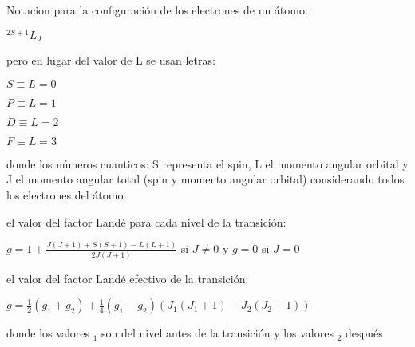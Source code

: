 \documentclass[10pt]{book}
\begin{document}
Notacion para la configuración de los electrones de un átomo:
\begin{description}
\item $^{2S+1}L_{J}$
\item pero en lugar del valor de L se usan letras:
\item $S \equiv L =0 $
\item $P \equiv L =1 $
\item $D \equiv L =2 $
\item $F \equiv L =3 $
\item donde los números cuanticos: S representa  el spin, 
L el momento angular orbital y J el momento angular total (spin y momento angular orbital) 
considerando todos los electrones del átomo
\item el valor del factor Landé para cada nivel de la transición:

$g = 1 + \frac{J(J+1) + S(S+1) - L(L+1)}{2J(J+1)}$ si $J \neq 0$ y $g=0$ si $J=0$

\item el valor del factor Landé efectivo de la transición:

$\bar{g} = \frac{1}{2}(g_1 + g_2) + \frac{1}{4}(g_1 - g_2)(J_1(J_1+1) - J_2(J_2 + 1))$

donde los valores $_1$ son del nivel antes de la transición y los valores $_2$ después


\end{description}
\end{document}

